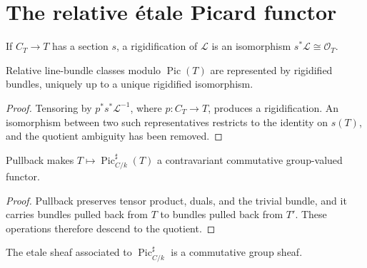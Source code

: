 \chapter{The relative étale Picard functor}
\label{pa-ch-picard}

\begin{definition}
  \label{pa-def-rigidified-line-bundle}
  \cite{kleiman-picard}
  If \(C_T\to T\) has a section \(s\), a rigidification of \(\mathcal L\) is
  an isomorphism \(s^*\mathcal L\cong\mathcal O_T\).
\end{definition}

\begin{lemma}
  \label{pa-lem-rigidification}
  \cite{kleiman-picard}
  Relative line-bundle classes modulo \(\operatorname{Pic}(T)\) are
  represented by rigidified bundles, uniquely up to a unique rigidified
  isomorphism.
\end{lemma}

\begin{proof}
  Tensoring by \(p^*s^*\mathcal L^{-1}\), where \(p:C_T\to T\), produces a
  rigidification.  An isomorphism between two such representatives restricts
  to the identity on \(s(T)\), and the quotient ambiguity has been removed.
\end{proof}

\begin{lemma}
  \label{pa-lem-picard-presheaf-group}
  \cite{kleiman-picard}
  Pullback makes \(T\mapsto\operatorname{Pic}^{\sharp}_{C/k}(T)\) a
  contravariant commutative group-valued functor.
\end{lemma}

\begin{proof}
  Pullback preserves tensor product, duals, and the trivial bundle, and it
  carries bundles pulled back from \(T\) to bundles pulled back from \(T'\).
  These operations therefore descend to the quotient.
\end{proof}

\begin{lemma}
  \label{pa-lem-etale-sheaf-group}
  \cite{kleiman-picard}
  The etale sheaf associated to
  \(\operatorname{Pic}^{\sharp}_{C/k}\) is a commutative group sheaf.
\end{lemma}

